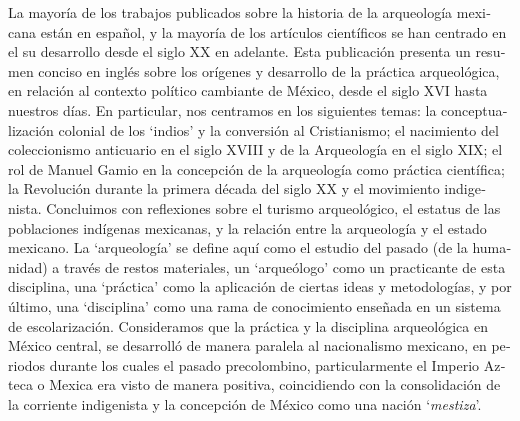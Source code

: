 \def\keywordname{Palabras Clave}
\def\keywords{México, Arqueología mexicana, colonialismo, nacionalismo, racismo, indigenismo, Indio, indígena, asimilación, mestizo, turismo arqueológico} %

\def\abstract{
\foreignlanguage{spanish}{La mayoría\marginnote{Resumen} de los trabajos publicados sobre la historia de la arqueología mexicana están en español, y la mayoría de los artículos científicos se han centrado en el su desarrollo desde el siglo XX en adelante. Esta publicación presenta un resumen conciso en inglés sobre los orígenes y desarrollo de la práctica arqueológica, en relación al contexto político cambiante de México, desde el siglo XVI hasta nuestros días. En particular, nos centramos en los siguientes temas: la conceptualización colonial de los ‘indios’ y la conversión al Cristianismo; el nacimiento del coleccionismo anticuario en el siglo XVIII y de la Arqueología en el siglo XIX; el rol de Manuel Gamio en la concepción de la arqueología como práctica científica; la Revolución durante la primera década del siglo XX y el movimiento indigenista. Concluimos con reflexiones sobre el turismo arqueológico, el estatus de las poblaciones indígenas mexicanas, y la relación entre la arqueología y el estado mexicano. La ‘arqueología’ se define aquí como el estudio del pasado (de la humanidad) a través de restos materiales, un ‘arqueólogo’ como un practicante de esta disciplina, una ‘práctica’ como la aplicación de ciertas ideas y metodologías, y por último, una ‘disciplina’ como una rama de conocimiento enseñada en un sistema de escolarización. Consideramos que la práctica y la disciplina arqueológica en México central, se desarrolló de manera paralela al nacionalismo mexicano, en periodos durante los cuales el pasado precolombino, particularmente el Imperio Azteca o Mexica era visto de manera positiva, coincidiendo con la consolidación de la corriente indigenista y la concepción de México como una nación ‘\textit{mestiza}’.}}%

\begin{IJSRAabstract}
\abstract
\end{IJSRAabstract}

\IJSRAclosing